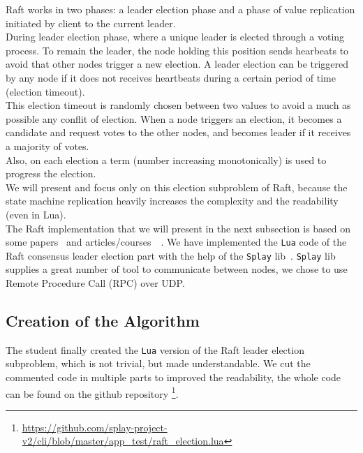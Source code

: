 \documentclass{eplmastersthesis}
\begin{document}
        Raft works in two phases: a leader election phase and a phase of
        value replication initiated by client to the current leader.\\
        During leader election phase, where a unique leader is elected
        through a voting process. To remain the leader, the node holding
        this position sends hearbeats to avoid that other nodes trigger a
        new election. A leader election can be triggered by any node if it
        does not receives heartbeats during a certain period of time (election
        timeout).\\
        This election timeout is randomly chosen between two values
        to avoid a much as possible any conflit of election. When a node
        triggers an election, it becomes a candidate and request votes to
        the other nodes, and becomes leader if it receives a majority of votes.\\
        Also, on each election a term (number increasing monotonically)
        is used to progress the election.\\
        We will present and focus only on this election subproblem of
        Raft, because the state machine replication heavily increases the complexity and
        the readability (even in Lua).\\

        The Raft implementation that we will present in the next subsection is based on
        some papers~\cite{RaftPaper} and articles/courses~\cite{RaftSlide}~\cite{RaftSite}.
        We have implemented the \texttt{Lua} code of the Raft consensus leader
        election part with the help of the \texttt{Splay} lib~\cite{SplayLib}.
        \texttt{Splay} lib supplies a great number of tool to communicate
        between nodes, we chose to use Remote Procedure Call (RPC) over UDP.\\

      \subsection{Creation of the Algorithm}

        The student finally created the \texttt{Lua} version of the Raft leader
        election subproblem, which is not trivial, but made
        understandable. We cut the commented code in multiple parts to improved the readability,
        the whole code can be found on the github repository
        \footnote{\url{https://github.com/splay-project-v2/cli/blob/master/app_test/raft_election.lua}}.
\end{document}
